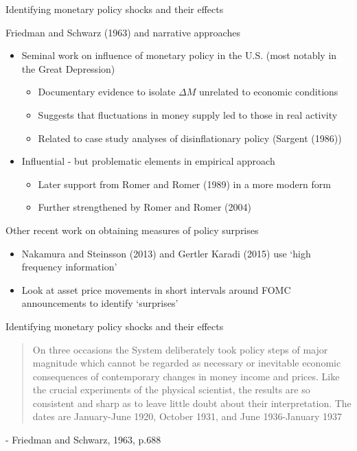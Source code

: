 \begin{frame}{Identifying monetary policy shocks and their effects}

Friedman and Schwarz (1963) and narrative approaches
\begin{itemize}
\item Seminal work on influence of monetary policy in the U.S. (most notably in the Great Depression)
	\begin{itemize}
	\item	Documentary evidence to isolate $\Delta M$ unrelated to economic conditions
	\item	Suggests that fluctuations in money supply led to those in real activity
	\item	Related to case study analyses of disinflationary policy (Sargent (1986))
	\end{itemize}
\item Influential - but problematic elements in empirical approach
	\begin{itemize}
	\item 	Later support from Romer and Romer (1989) in a more modern form
	\item	Further strengthened by Romer and Romer (2004)
	\end{itemize}
\end{itemize}

\vspace{2mm}
Other recent work on obtaining measures of policy surprises
\begin{itemize}
\item	Nakamura and Steinsson (2013) and Gertler Karadi (2015) use `high frequency information'
\item	Look at asset price movements in short intervals around FOMC announcements to identify `surprises'
\end{itemize}

\end{frame}



\begin{frame}{Identifying monetary policy shocks and their effects}

\begin{quotation}
On three occasions the System deliberately took policy steps of major magnitude which cannot be regarded as necessary or inevitable economic consequences of contemporary changes in money income and prices. Like the crucial experiments of the physical scientist, the results are so consistent and sharp as to leave little doubt about their interpretation. The dates are January-June 1920, October 1931, and June 1936-January 1937
\end{quotation}
\center - Friedman and Schwarz, 1963, p.688

\end{frame}

